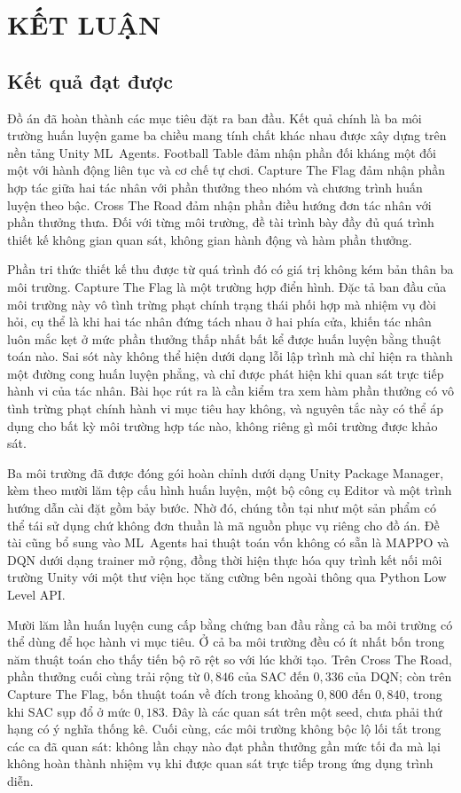 \fontsize{13pt}{22.5pt}\selectfont

\clearpage
\section{KẾT LUẬN}

\subsection{Kết quả đạt được}
\indent Đồ án đã hoàn thành các mục tiêu đặt ra ban đầu. Kết quả chính là ba môi trường
huấn luyện game ba chiều mang tính chất khác nhau được xây dựng trên nền tảng Unity
ML~Agents. Football Table đảm nhận phần đối kháng một đối một với hành động liên tục và
cơ chế tự chơi. Capture The Flag đảm nhận phần hợp tác giữa hai tác nhân với phần thưởng
theo nhóm và chương trình huấn luyện theo bậc. Cross The Road đảm nhận phần điều hướng đơn
tác nhân với phần thưởng thưa. Đối với từng môi trường, đề tài trình bày đầy đủ quá trình
thiết kế không gian quan sát, không gian hành động và hàm phần thưởng.

\indent Phần tri thức thiết kế thu được từ quá trình đó có giá trị không kém bản thân ba
môi trường. Capture The Flag là một trường hợp điển hình. Đặc tả ban đầu của môi trường
này vô tình trừng phạt chính trạng thái phối hợp mà nhiệm vụ đòi hỏi, cụ thể là khi hai
tác nhân đứng tách nhau ở hai phía cửa, khiến tác nhân luôn mắc kẹt ở mức phần thưởng thấp
nhất bất kể được huấn luyện bằng thuật toán nào. Sai sót này không thể hiện dưới dạng lỗi
lập trình mà chỉ hiện ra thành một đường cong huấn luyện phẳng, và chỉ được phát hiện khi
quan sát trực tiếp hành vi của tác nhân. Bài học rút ra là cần kiểm tra xem hàm phần
thưởng có vô tình trừng phạt chính hành vi mục tiêu hay không, và nguyên tắc này có thể áp
dụng cho bất kỳ môi trường hợp tác nào, không riêng gì môi trường được khảo sát.

\indent Ba môi trường đã được đóng gói hoàn chỉnh dưới dạng Unity Package Manager, kèm
theo mười lăm tệp cấu hình huấn luyện, một bộ công cụ Editor và một trình hướng dẫn cài
đặt gồm bảy bước. Nhờ đó, chúng tồn tại như một sản phẩm có thể tái sử dụng chứ không đơn
thuần là mã nguồn phục vụ riêng cho đồ án. Đề tài cũng bổ sung vào ML~Agents hai thuật
toán vốn không có sẵn là MAPPO và DQN dưới dạng trainer mở rộng, đồng thời hiện thực hóa
quy trình kết nối môi trường Unity với một thư viện học tăng cường bên ngoài thông qua
Python Low Level API.

\indent Mười lăm lần huấn luyện cung cấp bằng chứng ban đầu rằng cả ba môi trường có thể
dùng để học hành vi mục tiêu. Ở
cả ba môi trường đều có ít nhất bốn trong năm thuật toán cho thấy tiến bộ rõ rệt so với
lúc khởi tạo. Trên Cross The Road, phần
thưởng cuối cùng trải rộng từ $0{,}846$ của SAC đến $0{,}336$ của DQN; còn trên Capture The
Flag, bốn thuật toán về đích trong khoảng $0{,}800$ đến $0{,}840$, trong khi SAC sụp đổ ở
mức $0{,}183$. Đây là các quan sát trên một seed, chưa phải thứ hạng có ý nghĩa thống kê.
Cuối cùng, các môi trường không bộc lộ lối tắt trong các ca đã quan sát: không lần chạy nào
đạt phần thưởng gần mức tối đa mà lại không hoàn thành nhiệm vụ khi được quan sát trực
tiếp trong ứng dụng trình diễn.

